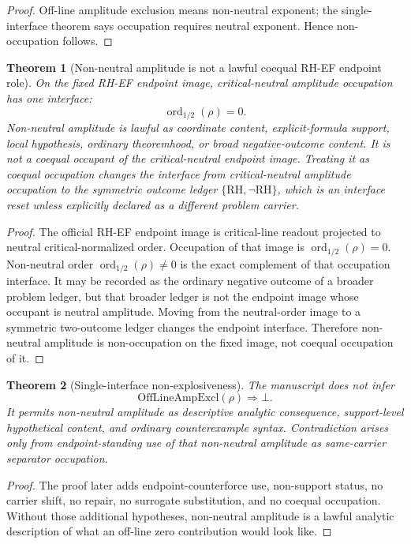 \documentclass[11pt]{article}
\newtheorem{theorem}{Theorem}[section]
\newcommand{\RH}{\mathrm{RH}}
\newcommand{\OffAmpExcl}{\mathrm{OffLineAmpExcl}}
\newcommand{\ordhalf}{\operatorname{ord}_{1/2}}
\begin{document}
\begin{proof}
Off-line amplitude exclusion means non-neutral exponent; the single-interface theorem says occupation requires neutral exponent.  Hence non-occupation follows.
\end{proof}


\begin{theorem}[Non-neutral amplitude is not a lawful coequal RH-EF endpoint role]
On the fixed RH-EF endpoint image, critical-neutral amplitude occupation has one interface:
\[
\ordhalf(\rho)=0.
\]
Non-neutral amplitude is lawful as coordinate content, explicit-formula support, local hypothesis, ordinary theoremhood, or broad negative-outcome content.  It is not a coequal occupant of the critical-neutral endpoint image.  Treating it as coequal occupation changes the interface from critical-neutral amplitude occupation to the symmetric outcome ledger \(\{\RH,\neg\RH\}\), which is an interface reset unless explicitly declared as a different problem carrier.
\end{theorem}

\begin{proof}
The official RH-EF endpoint image is critical-line readout projected to neutral critical-normalized order.  Occupation of that image is \(\ordhalf(\rho)=0\).  Non-neutral order \(\ordhalf(\rho)\ne0\) is the exact complement of that occupation interface.  It may be recorded as the ordinary negative outcome of a broader problem ledger, but that broader ledger is not the endpoint image whose occupant is neutral amplitude.  Moving from the neutral-order image to a symmetric two-outcome ledger changes the endpoint interface.  Therefore non-neutral amplitude is non-occupation on the fixed image, not coequal occupation of it.
\end{proof}

\begin{theorem}[Single-interface non-explosiveness]
The manuscript does not infer
\[
\OffAmpExcl(\rho)\Rightarrow\bot.
\]
It permits non-neutral amplitude as descriptive analytic consequence, support-level hypothetical content, and ordinary counterexample syntax.  Contradiction arises only from endpoint-standing use of that non-neutral amplitude as same-carrier separator occupation.
\end{theorem}

\begin{proof}
The proof later adds endpoint-counterforce use, non-support status, no carrier shift, no repair, no surrogate substitution, and no coequal occupation.  Without those additional hypotheses, non-neutral amplitude is a lawful analytic description of what an off-line zero contribution would look like.
\end{proof}
\end{document}

